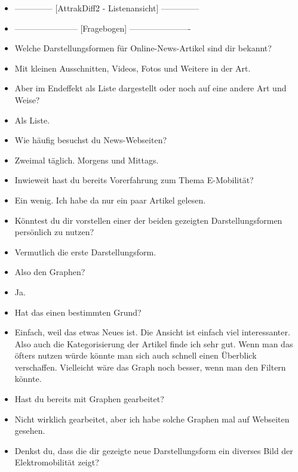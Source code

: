 {\begin{itemize}[]
            \item {--------------} [AttrakDiff2 - Listenansicht] {--------------}
            \item {-----------------------} [Fragebogen] {----------------------}
            \item {} Welche Darstellungsformen für Online-News-Artikel sind dir bekannt?
            \item {} Mit kleinen Ausschnitten, Videos, Fotos und Weitere in der Art.
            \item {} Aber im Endeffekt als Liste dargestellt oder noch auf eine andere Art und Weise?
            \item {} Als Liste.
            \item {} Wie häufig besuchst du News-Webseiten?
            \item {} Zweimal täglich. Morgens und Mittags.
            \item {} Inwieweit hast du bereits Vorerfahrung zum Thema E-Mobilität?
            \item {} Ein wenig. Ich habe da nur ein paar Artikel gelesen.
            \item {} Könntest du dir vorstellen einer der beiden gezeigten Darstellungsformen persönlich zu nutzen?
            \item {} Vermutlich die erste Darstellungsform.
            \item {} Also den Graphen?
            \item {} Ja.
            \item {} Hat das einen bestimmten Grund?
            \item {} Einfach, weil das etwas Neues ist.
                  Die Ansicht ist einfach viel interessanter.
                  Also auch die Kategorisierung der Artikel finde ich sehr gut.
                  Wenn man das öfters nutzen würde könnte man sich auch schnell einen Überblick verschaffen.
                  Vielleicht wäre das Graph noch besser, wenn man den Filtern könnte.
            \item {} Hast du bereits mit Graphen gearbeitet?
            \item {} Nicht wirklich gearbeitet, aber ich habe solche Graphen mal auf Webseiten gesehen.
            \item {} Denkst du, dass die dir gezeigte neue Darstellungsform ein diverses Bild der Elektromobilität zeigt?

\end{itemize}}
